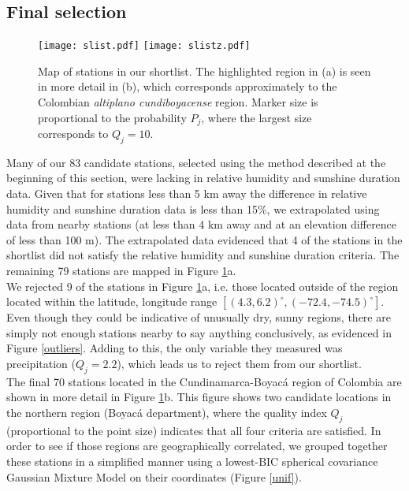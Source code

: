 \documentclass[12pt]{iopart}
\begin{document}
\subsection{Final selection}

\begin{figure}
\begin{center}
\texttt{[image: slist.pdf]}
\texttt{[image: slistz.pdf]}
\caption{Map of stations in our shortlist. The highlighted region in (a) is seen in more detail in (b), which corresponds approximately to the Colombian \emph{altiplano cundiboyacense} region. Marker size is proportional to the probability $P_j$, where the largest size corresponds to $Q_j=10$.}\label{shortlist}
\end{center}
\end{figure}



Many of our 83 candidate stations, selected using the method described at the beginning of this section, were lacking in relative humidity and sunshine duration data. Given that for stations less than 5 km away the difference in relative humidity and sunshine duration data is less than 15\%, we extrapolated using data from nearby stations (at less than 4 km away and at an elevation difference of less than 100 m). The extrapolated data evidenced that 4 of the stations in the shortlist did not satisfy the relative humidity and sunshine duration criteria.  The remaining 79 stations are mapped in Figure \ref{shortlist}a.\\

We rejected 9 of the stations in Figure \ref{shortlist}a, i.e. those located outside of the region located within the latitude, longitude range $[(4.3,6.2)^\circ,(-72.4,-74.5)^\circ]$. Even though they could be indicative of unusually dry, sunny regions, there are simply not enough stations nearby to say anything conclusively, as evidenced in Figure \ref{outliers}. Adding to this, the only variable they measured was precipitation ($Q_j=2.2$), which leads us to reject them from our shortlist. \\

The final 70 stations located in the Cundinamarca-Boyac\'a region of Colombia are shown in more detail in Figure \ref{shortlist}b. This figure shows two candidate locations in the northern region (Boyac\'a department), where the quality index $Q_j$ (proportional to the point size) indicates that all four criteria are satisfied. In order to see if those regions are geographically correlated, we grouped together these stations in a simplified manner using a lowest-BIC spherical covariance Gaussian Mixture Model on their coordinates (Figure \ref{unif}).
\end{document}
